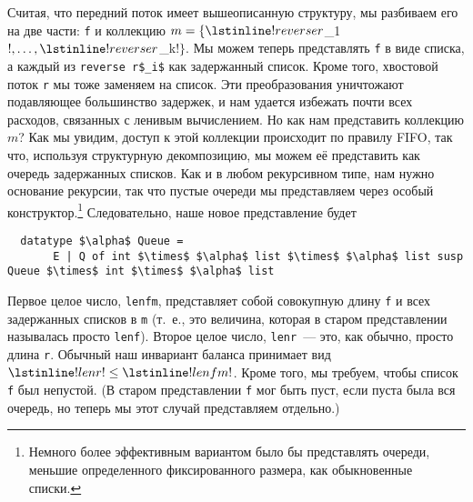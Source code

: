Считая, что передний поток имеет вышеописанную структуру, мы разбиваем
его на две части: \lstinline!f! и коллекцию
$m = \{\lstinline!reverse r$_1$!, \ldots, \lstinline!reverse r$_k$!\}$.
Мы можем теперь представлять \lstinline!f! в виде списка, а каждый из
\lstinline!reverse r$_i$! как задержанный список. Кроме того,
хвостовой поток \lstinline!r! мы тоже заменяем на список. Эти
преобразования уничтожают подавляющее большинство задержек, и нам
удается избежать почти всех расходов, связанных с ленивым
вычислением. Но как нам представить коллекцию $m$? Как мы увидим,
доступ к этой коллекции происходит по правилу FIFO, так что, используя
структурную декомпозицию, мы можем её представить как очередь
задержанных списков.  Как и в любом рекурсивном типе, нам нужно
основание рекурсии, так что пустые очереди мы представляем через
особый конструктор.\footnote{%
  Немного более эффективным вариантом было бы представлять очереди,
  меньшие определенного фиксированного размера, как обыкновенные списки.%
}
Следовательно, наше новое представление будет
\begin{lstlisting}
  datatype $\alpha$ Queue =
       E | Q of int $\times$ $\alpha$ list $\times$ $\alpha$ list susp Queue $\times$ int $\times$ $\alpha$ list
\end{lstlisting}
Первое целое число, \lstinline!lenfm!, представляет собой совокупную
длину \lstinline!f! и всех задержанных списков в \lstinline!m! (т.~е.,
это величина, которая в старом представлении называлась просто
\lstinline!lenf!). Второе целое число, \lstinline!lenr!~--- это, как
обычно, просто длина \lstinline!r!. Обычный наш инвариант баланса
принимает вид $\lstinline!lenr! \le \lstinline!lenfm!$. Кроме того, мы
требуем, чтобы список \lstinline!f! был непустой. (В старом
представлении \lstinline!f! мог быть пуст, если пуста была вся
очередь, но теперь мы этот случай представляем отдельно.)

